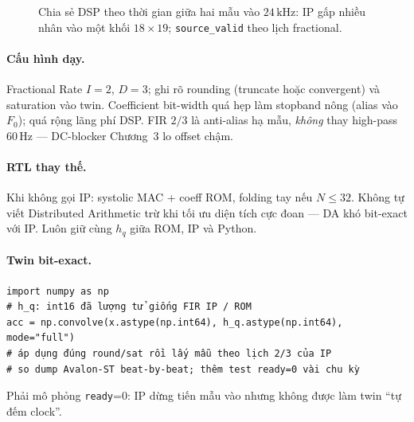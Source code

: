\begin{figure}[H]
\centering
{}
\caption{Chia sẻ DSP theo thời gian giữa hai mẫu vào $24\,\text{kHz}$: IP gấp nhiều nhân vào một khối $18\times 19$; \texttt{source\_valid} theo lịch fractional.}
\label{fig:ch04_dsp_share}
\end{figure}

\paragraph{Cấu hình dạy.} Fractional Rate $I=2$, $D=3$; ghi rõ rounding (truncate hoặc convergent) và saturation vào twin. Coefficient bit-width quá hẹp làm stopband nông (alias vào $F_0$); quá rộng lãng phí DSP. FIR $2/3$ là anti-alias hạ mẫu, \emph{không} thay high-pass $60\,\text{Hz}$ --- DC-blocker Chương~3 lo offset chậm.

\paragraph{RTL thay thế.} Khi không gọi IP: systolic MAC + coeff ROM, folding tay nếu $N\le 32$. Không tự viết Distributed Arithmetic trừ khi tối ưu diện tích cực đoan --- DA khó bit-exact với IP. Luôn giữ cùng $h_q$ giữa ROM, IP và Python.

\paragraph{Twin bit-exact.}
\begin{verbatim}
import numpy as np
# h_q: int16 đã lượng tử giống FIR IP / ROM
acc = np.convolve(x.astype(np.int64), h_q.astype(np.int64), mode="full")
# áp dụng đúng round/sat rồi lấy mẫu theo lịch 2/3 của IP
# so dump Avalon-ST beat-by-beat; thêm test ready=0 vài chu kỳ
\end{verbatim}
Phải mô phỏng \texttt{ready}=0: IP dừng tiến mẫu vào nhưng không được làm twin ``tự đếm clock''.


